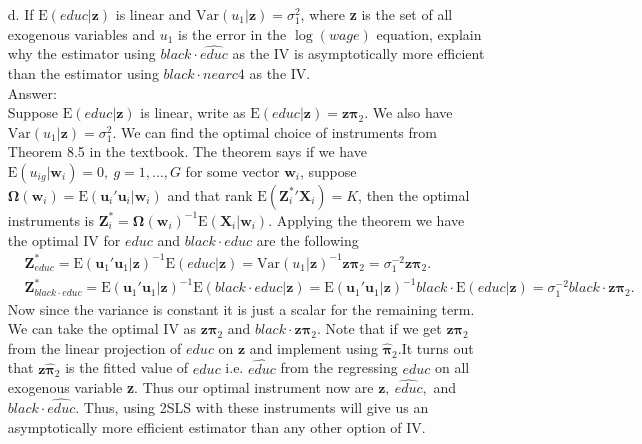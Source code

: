 \documentclass[10pt]{article}
\newcommand{\E}{\text{E}}
\newcommand{\V}{\text{Var}}
\begin{document}
\begin{enumerate}
\item[d.] If $\E(educ|\textbf{z})$ is linear and $\V(u_1|\textbf{z})=\sigma_1^2$, where \textbf{z} is the set of all exogenous variables and $u_1$ is the error in the $\log(wage)$ equation, explain why the estimator using $black\cdot\hat{educ}$ as the IV is asymptotically more efficient than the estimator using $black\cdot nearc4$ as the IV.
\\ Answer:\\
Suppose $\E(educ|\textbf{z})$ is linear, write as $\E(educ|\textbf{z})=\textbf{z}\pmb{\pi}_2$. We also have $\V(u_1|\textbf{z})=\sigma_1^2$. We can find the optimal choice of instruments from Theorem 8.5 in the textbook. The theorem says if we have $\E(u_{ig}|\textbf{w}_i)=0,\  g=1,\ldots,G$ for some vector $\textbf{w}_i$, suppose $\pmb{\Omega}(\textbf{w}_i)=\E(\textbf{u}_i'\textbf{u}_i|\textbf{w}_i)$ and that rank $\E(\textbf{Z}_i^*'\textbf{X}_i)=K$, then the optimal instruments is $\textbf{Z}_i^*=\pmb{\Omega}(\textbf{w}_i)^{-1}\E(\textbf{X}_i|\textbf{w}_i).$
Applying the theorem we have the optimal IV for $educ$ and $black\cdot educ$ are the following
\begin{align*}
    &\textbf{Z}_{educ}^*=\E(\textbf{u}_1'\textbf{u}_1|\textbf{z})^{-1}\E(educ|\textbf{z})=\V(u_1|\textbf{z})^{-1}\textbf{z}\pmb{\pi}_2=\sigma_1^{-2}\textbf{z}\pmb{\pi}_2.\\
    &\textbf{Z}_{black\cdot educ}^*=\E(\textbf{u}_1'\textbf{u}_1|\textbf{z})^{-1}\E(black\cdot educ|\textbf{z})=\E(\textbf{u}_1'\textbf{u}_1|\textbf{z})^{-1}black \cdot \E(educ|\textbf{z})=\sigma_1^{-2}black\cdot \textbf{z}\pmb{\pi}_2.
\end{align*}
Now since the variance is constant it is just a scalar for the remaining term. We can take the optimal IV as $\textbf{z}\pmb{\pi}_2$ and $black\cdot \textbf{z}\pmb{\pi}_2$. Note that if we get $\textbf{z}\pmb{\pi}_2$ from the linear projection of $educ$ on $\textbf{z}$ and implement using $\hat{\pmb{\pi}}_2$.It turns out that $\textbf{z}\hat{\pmb{\pi}}_2$ is the fitted value of $educ$ i.e. $\hat{educ}$ from the regressing $educ$ on all exogenous variable \textbf{z}. Thus our optimal instrument now are $\textbf{z}, \ \hat{educ},$ and $black \cdot \hat{educ}$. Thus, using 2SLS with these instruments will give us an asymptotically more efficient estimator than any other option of IV.

\end{enumerate}
\end{document}
